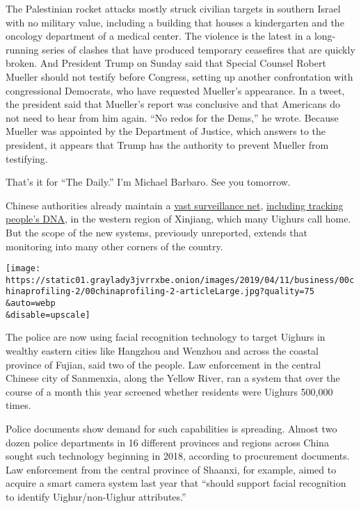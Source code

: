 The Palestinian rocket attacks mostly struck civilian targets in
southern Israel with no military value, including a building that houses
a kindergarten and the oncology department of a medical center. The
violence is the latest in a long-running series of clashes that have
produced temporary ceasefires that are quickly broken. And President
Trump on Sunday said that Special Counsel Robert Mueller should not
testify before Congress, setting up another confrontation with
congressional Democrats, who have requested Mueller's appearance. In a
tweet, the president said that Mueller's report was conclusive and that
Americans do not need to hear from him again. ``No redos for the Dems,''
he wrote. Because Mueller was appointed by the Department of Justice,
which answers to the president, it appears that Trump has the authority
to prevent Mueller from testifying.

That's it for ``The Daily.'' I'm Michael Barbaro. See you tomorrow.

Chinese authorities already maintain a
\href{https://www.nytimes3xbfgragh.onion/interactive/2019/04/04/world/asia/xinjiang-china-surveillance-prison.html}{vast
surveillance net},
\href{https://www.nytimes3xbfgragh.onion/2019/02/21/business/china-xinjiang-uighur-dna-thermo-fisher.html}{including
tracking people's DNA}, in the western region of Xinjiang, which many
Uighurs call home. But the scope of the new systems, previously
unreported, extends that monitoring into many other corners of the
country.

\texttt{[image: https://static01.graylady3jvrrxbe.onion/images/2019/04/11/business/00chinaprofiling-2/00chinaprofiling-2-articleLarge.jpg?quality=75\\\&auto=webp\\\&disable=upscale]}

The police are now using facial recognition technology to target Uighurs
in wealthy eastern cities like Hangzhou and Wenzhou and across the
coastal province of Fujian, said two of the people. Law enforcement in
the central Chinese city of Sanmenxia, along the Yellow River, ran a
system that over the course of a month this year screened whether
residents were Uighurs 500,000 times.

Police documents show demand for such capabilities is spreading. Almost
two dozen police departments in 16 different provinces and regions
across China sought such technology beginning in 2018, according to
procurement documents. Law enforcement from the central province of
Shaanxi, for example, aimed to acquire a smart camera system last year
that ``should support facial recognition to identify Uighur/non-Uighur
attributes.''

